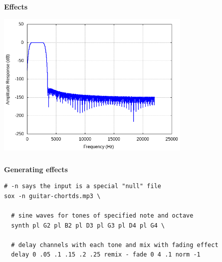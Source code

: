 \documentclass[usenames,dvipsnames, 18pt, compress, aspectratio=169]{beamer}
\begin{document}
\begin{frame}[fragile]{}
    \frametitle{}
    \begin{center}
        \textbf{Effects}
        \vspace{0.2cm}

        \includegraphics[width=0.7\textwidth]{phone.png}

    \end{center}
\end{frame}

\begin{frame}[fragile]{}
    \frametitle{}
    \begin{center}
        \textbf{Generating effects}
        \vspace{0.2cm}

        \begin{verbatim}
# -n says the input is a special "null" file
sox -n guitar-chortds.mp3 \

  # sine waves for tones of specified note and octave
  synth pl G2 pl B2 pl D3 pl G3 pl D4 pl G4 \

  # delay channels with each tone and mix with fading effect
  delay 0 .05 .1 .15 .2 .25 remix - fade 0 4 .1 norm -1
        \end{verbatim}

    \end{center}
\end{frame}
\end{document}
